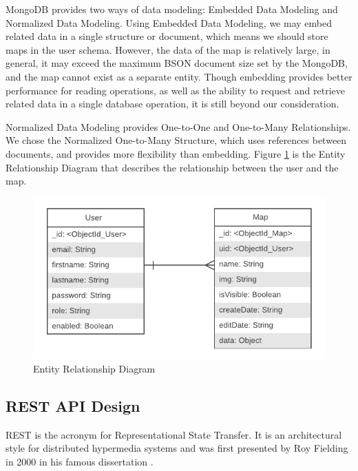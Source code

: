 MongoDB provides two ways of data modeling: Embedded Data Modeling and Normalized Data Modeling. Using Embedded Data Modeling, we may embed related data in a single structure or document, which means we should store maps in the user schema. However, the data of the map is relatively large, in general, it may exceed the maximum BSON document size set by the MongoDB, and the map cannot exist as a separate entity. Though embedding provides better performance for reading operations, as well as the ability to request and retrieve related data in a single database operation, it is still beyond our consideration.

Normalized Data Modeling provides One-to-One and One-to-Many Relationships. We chose the Normalized One-to-Many Structure, which uses references between documents, and provides more flexibility than embedding. Figure \ref{fig:ER Diagram} is the Entity Relationship Diagram that describes the relationship between the user and the map.

\begin{figure}[htbp]
\centering
\includegraphics[width=\textwidth]{section03/assets/ER_Diagram.png}
\caption[Entity Relationship Diagram]{\label{fig:ER Diagram}Entity Relationship Diagram}
\end{figure}

\subsection{REST API Design}
\label{sec:Design>REST API Design}
REST is the acronym for Representational State Transfer. It is an architectural style for distributed hypermedia systems and was first presented by Roy Fielding in 2000 in his famous dissertation \cite{Fielding00architecturalstyles}.

